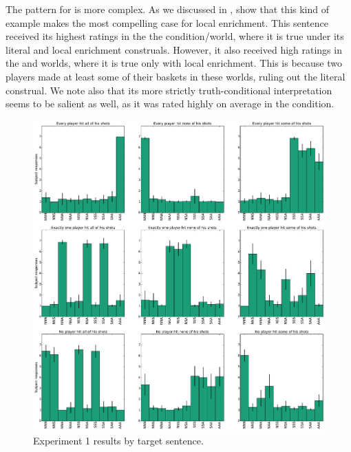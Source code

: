 \documentclass[leqno]{article}
\begin{document}
The pattern for  is
more complex. As we discussed in ,
\citeauthor{Chemla:Spector:2011} show that this kind of example makes
the most compelling case for local enrichment. This sentence received
its highest ratings in the the  condition/world, where it
is true under its literal and local enrichment construals. However, it
also received high ratings in the  and  worlds,
where it is true only with local enrichment. This is because two players made at
least some of their baskets in these worlds, ruling out the literal construal.  We
note also that its more strictly truth-conditional interpretation
seems to be salient as well, as it was rated highly on average in the
 condition.

\begin{figure}[tp]
  \centering
  \includegraphics[width=1\textwidth]{fig/basketball-pilot-2-11-14-results-parsed}
  \caption{Experiment 1 results by target sentence.}
  \label{fig:exp1-results}
\end{figure}
\end{document}
